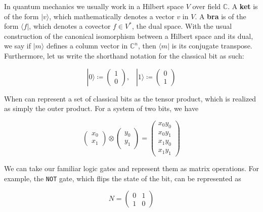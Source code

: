 \documentclass{article}
\theoremstyle{definition}
\begin{document}
    In quantum mechanics we usually work in a Hilbert space $V$ over field $\mathbb{C}$. A \textbf{ket} is of the form $| v \rangle$, which mathematically denotes a vector $v$ in $V$. A \textbf{bra} is of the form $\langle f |$, which denotes a covector $f \in V^\ast$, the dual space. With the usual construction of the canonical isomorphism between a Hilbert space and its dual, we say if $| m \rangle$ defines a column vector in $\mathbb{C}^n$, then $\langle m |$ is its conjugate transpose. Furthermore, let us write the shorthand notation for the classical bit as such: 

      \[ |0 \rangle \coloneqq \begin{pmatrix} 1 \\ 0 \end{pmatrix} , \;\;\; | 1 \rangle \coloneqq \begin{pmatrix} 0 \\ 1 \end{pmatrix}\] 

    When can represent a set of classical bits as the tensor product, which is realized as simply the outer product. For a system of two bits, we have 

      \[\begin{pmatrix} x_0 \\ x_1 \end{pmatrix} \otimes \begin{pmatrix} y_0 \\ y_1 \end{pmatrix} = \begin{pmatrix} x_0 y_0 \\ x_0 y_1 \\ x_1 y_0 \\ x_1 y_1 \end{pmatrix}\]

    We can take our familiar logic gates and represent them as matrix operations. For example, the \texttt{NOT} gate, which flips the state of the bit, can be represented as 

      \[N = \begin{pmatrix} 0 & 1 \\ 1 & 0 \end{pmatrix}\]
\end{document}

